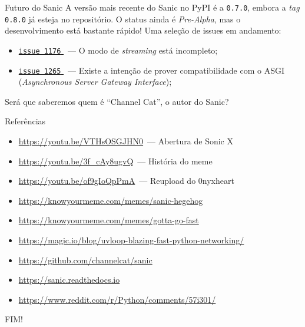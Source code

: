 \documentclass[utf8]{beamer}
\begin{document}
\begin{frame}{Futuro do Sanic}
  A versão mais recente do Sanic no PyPI é a \texttt{0.7.0},
  embora a \emph{tag} \texttt{0.8.0} já esteja no repositório.
  \vfill
  O status ainda é \emph{Pre-Alpha},
  mas o desenvolvimento está bastante rápido!
  \vfill
  Uma seleção de issues em andamento:
  \begin{itemize}
    \item
      \href{https://github.com/channelcat/sanic/issues/1176}{%
        \nolinkurl{issue 1176}%
      }~---
      O modo de \emph{streaming} está incompleto;

    \item
      \href{https://github.com/channelcat/sanic/issues/1265}{%
        \nolinkurl{issue 1265}%
      }~---
      Existe a intenção de prover compatibilidade com o ASGI
      (\emph{Asynchronous Server Gateway Interface});
  \end{itemize}
  \vfill
  Será que saberemos quem é ``Channel Cat'', o autor do Sanic?
\end{frame}


\begin{frame}{Referências}
  \begin{itemize}
    \fontsize{.8em}{0}\selectfont
    \item \url{https://youtu.be/VTHsOSGJHN0}~--- Abertura de Sonic X
    \item \url{https://youtu.be/3f_cAy8ugvQ}~--- História do meme
    \item \url{https://youtu.be/of9gIoQpPmA}~--- Reupload do 0nyxheart
    \item \url{https://knowyourmeme.com/memes/sanic-hegehog}
    \item \url{https://knowyourmeme.com/memes/gotta-go-fast}
    \item \url{https://magic.io/blog/uvloop-blazing-fast-python-networking/}
    \item \url{https://github.com/channelcat/sanic}
    \item \url{https://sanic.readthedocs.io}
    \item \url{https://www.reddit.com/r/Python/comments/57i301/}
  \end{itemize}
  \vfill
  \begin{center}\fontsize{2cm}{0}\selectfont
    FIM!
  \end{center}
\end{frame}
\end{document}

